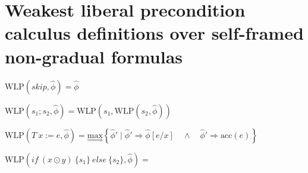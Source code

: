 \documentclass {article}
\newcommand{\eif}[3]{if \ ( #1 ) \ \{ #2 \} \ else \ \{#3\}}
\newcommand{\fphi}{\widehat{\phi}}
\newcommand{\acc}[1]{\text{acc}(#1)}
\newcommand{\imp}{\Rightarrow}
\newcommand{\maximp}[2]{\underset{\Rightarrow}{\text{max}}\left\{#1 \mid #2\right\}}
\newcommand{\wlp}[2]{\text{WLP}(#1,#2)}
\begin{document}

\section{Weakest liberal precondition calculus definitions over self-framed non-gradual formulas}
\hspace{0.5cm}

$\wlp{skip}{\fphi} = \fphi  $

\vspace{0.5cm}

$\wlp{s_1;s_2}{\fphi} = \wlp{s_1}{\wlp{s_2}{\fphi}} $

\vspace{0.5cm}



$\wlp{T \ x := e}{\fphi} =\maximp{\fphi'}{\fphi' \imp \fphi[e/x] \quad \wedge \quad \fphi' \imp \acc{e}} $

\vspace{0.5cm}

$\wlp{\eif{x \odot y}{s_1}{s_2}}{\fphi} = $


\vspace{0.5cm}
\end{document}
